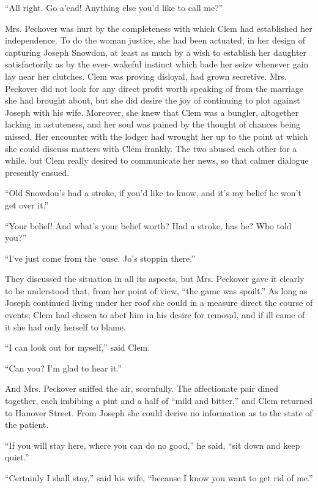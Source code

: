 ``All right. Go a'ead! Anything else you'd like to call me?''

Mrs. Peckover was hurt by the completeness with which Clem had
established her independence. To do the woman justice, she had been
actuated, in her design of capturing Joseph Snowdon, at least as much by
a wish {\protect\hypertarget{166}{}{}}to establish her daughter
satisfactorily as by the ever- wakeful instinct which bade her seize
whenever gain lay near her clutches. Clem was proving disloyal, had
grown secretive. Mrs. Peckover did not look for any direct profit worth
speaking of from the marriage she had brought about, but she did desire
the joy of continuing to plot against Joseph with his wife. Moreover,
she knew that Clem was a bungler, altogether lacking in astuteness, and
her soul was pained by the thought of chances being missed. Her
encounter with the lodger had wrought her up to the point at which she
could discuss matters with Clem frankly. The two abused each other for a
while, but Clem really desired to communicate her news, so that calmer
dialogue presently ensued.

``Old Snowdon's had a stroke, if you'd like to know, and it's my belief
he won't get over it.''

``Your belief! And what's your belief worth? Had a stroke, has he? Who
told you?''

``I've just come from the `ouse. Jo's stoppin there.''

They discussed the situation in all its
{\protect\hypertarget{167}{}{}}aspects, but Mrs. Peckover gave it
clearly to be understood that, from her point of view, ``the game was
spoilt.'' As long as Joseph continued living under her roof she could in
a measure direct the course of events; Clem had chosen to abet him in
his desire for removal, and if ill came of it she had only herself to
blame.

``I can look out for myself,'' said Clem.

``Can you? I'm glad to hear it.''

And Mrs. Peckover sniffed the air, scornfully. The affectionate pair
dined together, each imbibing a pint and a half of ``mild and bitter,''
and Clem returned to Hanover Street. From Joseph she could derive no
information as to the state of the patient.

``If you will stay here, where you can do no good,'' he said, ``sit down
and keep quiet.''

``Certainly I shall stay,'' said his wife, ``because I know you want to
get rid of me.''

